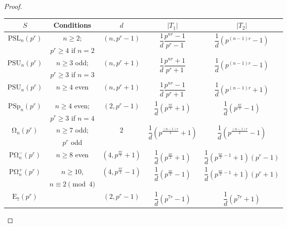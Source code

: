 \documentclass[11pt, a4paper]{article}
\numberwithin{equation}{section}
\theoremstyle{plain} %
\begin{document}
\begin{proof}
\vskip4mm
\begin{center}
\renewcommand{\arraystretch}{1.4}
\begin{tabular}{|c|c|c|c|c|}
\hline
$S$ & Conditions & $d$ & $|T_1|$ & $|T_2|$\\
\hline
\multirow{2}{*}{$\mathrm{PSL}_n(p^r)$}
 & $n\ge 2$; & \multirow{2}{*}{$(n,p^r-1)$}
 & \multirow{2}{*}{$\dfrac{1}{d}\dfrac{p^{nr}-1}{p^r-1}$}
 & \multirow{2}{*}{$\dfrac{1}{d}\left(p^{(n-1)r}-1\right)$}\\
 & $p^r\ge 4$ if $n=2$ & & & \\
\hline
\multirow{2}{*}{$\mathrm{PSU}_n(p^r)$}
 & $n\ge 3$ odd;  & \multirow{2}{*}{$(n,p^r+1)$}
 & \multirow{2}{*}{$\dfrac{1}{d}\dfrac{p^{nr}+1}{p^r+1}$}
 & \multirow{2}{*}{$\dfrac{1}{d}\left(p^{(n-1)r}-1\right)$}\\
 & $p^r\ge 3$ if $n=3$ & & & \\
\hline
$\mathrm{PSU}_n(p^r)$ & $n\ge 4$ even & $(n,p^r+1)$
 & $\dfrac{1}{d}\dfrac{p^{nr}-1}{p^r+1}$ & $\dfrac{1}{d}\left(p^{(n-1)r}+1\right)$\\
\hline
\multirow{2}{*}{$\mathrm{PSp}_n(p^r)$}
 & $n\ge 4$ even; & \multirow{2}{*}{$(2,p^r-1)$}
 & \multirow{2}{*}{$\dfrac{1}{d}\left(p^{\frac{nr}{2}}+1\right)$}
 & \multirow{2}{*}{$\dfrac{1}{d}\left(p^{\frac{nr}{2}}-1\right)$}\\
 &$p^r\ge 3$ if $n=4$ & & & \\
\hline
$\mathrm{\Omega}_n(p^r)$ & $n\ge 7$ odd;  & \multirow{2}{*}{$2$}
 & \multirow{2}{*}{$\dfrac{1}{d}\left(p^{\frac{(n-1)r}{2}}+1\right)$} & \multirow{2}{*}{$\dfrac{1}{d}\left(p^{\frac{(n-1)r}{2}}-1\right)$}\\
 &$p^r$ odd&&&\\
\hline
$\mathrm{P\Omega}_n^{-}(p^r)$ & $n\ge 8$ even & $(4,p^{\frac{nr}{2}}+1)$
 & $\dfrac{1}{d}\left(p^{\frac{nr}{2}}+1\right)$
 & $\dfrac{1}{d}\left(p^{\frac{nr}{2}-1}+1\right)(p^r-1)$\\
\hline
\multirow{2}{*}{$\mathrm{P\Omega}_n^{+}(p^r)$}
 & $n\ge 10$, & \multirow{2}{*}{$(4,p^{\frac{nr}{2}}-1)$}
 & \multirow{2}{*}{$\dfrac{1}{d}\left(p^{\frac{nr}{2}}-1\right)$}
 & \multirow{2}{*}{$\dfrac{1}{d}\left(p^{\frac{nr}{2}-1}+1\right)(p^r+1)$}\\
 & $n\equiv 2\pmod 4$ & & & \\
\hline
$\mathrm{E}_7(p^r)$ & & $(2,p^r-1)$ & $\dfrac{1}{d}\left(p^{7r}-1\right)$ & $\dfrac{1}{d}\left(p^{7r}+1\right)$\\
\hline
\end{tabular}
\end{center}



\end{proof}
\end{document}
